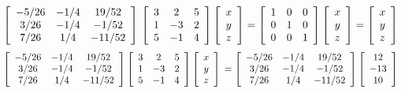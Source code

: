 \documentclass[a4paper, 12pt]{article}
\begin{document}
\[
\left[{
\begin{array}{ccc}
-5/26 & -1/4 & 19/52\\
3/26 & -1/4 & -1/52\\
7/26 & 1/4 & -11/52
\end{array} 
} \right]\\ 
\left[{
\begin{array}{ccc}
3 & 2 & 5 \\
1 & -3  & 2\\
5 & -1  & 4
\end{array}
} \right]
\left[{
\begin{array}{c} 
x \\
y \\
z
\end{array}
} \right]
=
\left[{
\begin{array}{ccc} 
1 & 0 & 0 \\
0 & 1 & 0 \\
0 & 0 & 1 
\end{array}
} \right]
\left[{
\begin{array}{c} 
x \\
y \\
z
\end{array}
} \right]
=
\left[{
\begin{array}{c} 
x \\
y \\
z
\end{array}
} \right]
\] 
\[
\left[{
\begin{array}{ccc}
-5/26 & -1/4 & 19/52\\
3/26 & -1/4 & -1/52\\
7/26 & 1/4 & -11/52
\end{array} 
} \right]
\left[{
\begin{array}{ccc}
3 & 2 & 5 \\
1 & -3  & 2\\
5 & -1  & 4
\end{array}
} \right]
\left[{
\begin{array}{c}
x \\
y \\
z
\end{array} 
} \right]\\ 
=
\left[{
\begin{array}{ccc}
-5/26 & -1/4 & 19/52\\
3/26 & -1/4 & -1/52\\
7/26 & 1/4 & -11/52
\end{array} 
} \right]
\left[{
\begin{array}{c} 
12 \\
-13 \\
10
\end{array}
} \right]
\]
\end{document}
